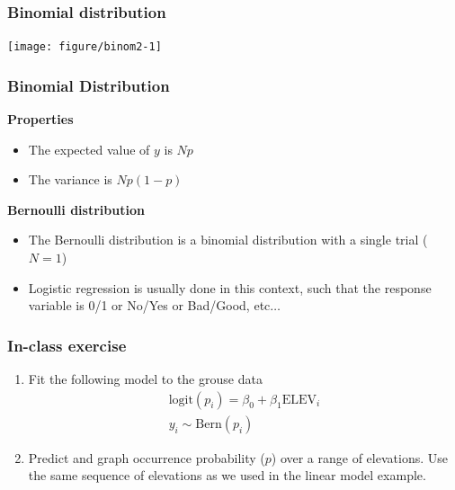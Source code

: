\documentclass[color=usenames,dvipsnames]{beamer}\usepackage[]{graphicx}\usepackage[]{color}
\newenvironment{knitrout}{}{} %
\begin{document}
\begin{frame}[fragile]
  \frametitle{Binomial distribution}%
  \vspace{-0.4cm}
\begin{center}
\begin{knitrout}
\color{fgcolor}
\texttt{[image: figure/binom2-1]} 
\end{knitrout}
\end{center}
\end{frame}




\begin{frame}
  \frametitle{Binomial Distribution}
  {\bf Properties}
  \begin{itemize}
    \item The expected value of $y$ is $Np$
    \item The variance is $Np(1-p)$
  \end{itemize}
  \pause
  \vfill
  {\bf Bernoulli distribution}
  \begin{itemize}
    \item The Bernoulli distribution is a binomial distribution with a
      single trial ($N=1$)
    \item Logistic regression is usually done in this context, such
      that the response variable is 0/1 or No/Yes or Bad/Good, etc$\dots$
  \end{itemize}
\end{frame}







\begin{frame}
  \frametitle{In-class exercise}
  \begin{enumerate}
  \item Fit the following model to the grouse data
    \begin{gather*}
      \mathrm{logit}(p_i) = \beta_0 + \beta_1\mathrm{ELEV}_i \\
      y_i \sim \mathrm{Bern}(p_i)
    \end{gather*}
  \item Predict and graph occurrence probability ($p$) over a range of
    elevations. Use the same sequence of elevations as we used in the
    linear model example.
  \end{enumerate}
\end{frame}
\end{document}
